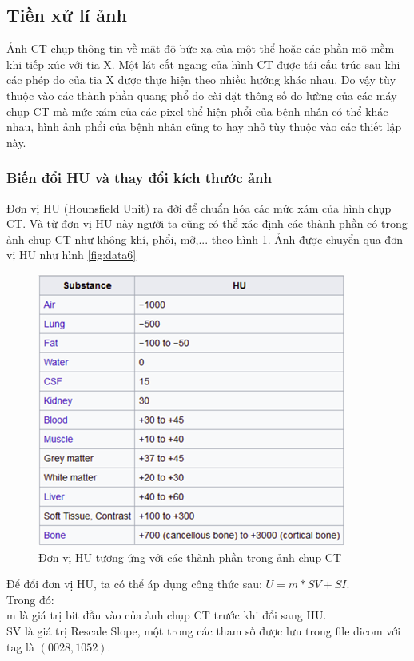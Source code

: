 \subsection{Tiền xử lí ảnh}
Ảnh CT chụp thông tin về mật độ bức xạ của một thể hoặc các phần mô mềm khi tiếp xúc với tia X. Một lát cắt ngang của hình CT được tái cấu trúc sau khi các phép đo của tia X được thực hiện theo nhiều hướng khác nhau. Do vậy tùy thuộc vào các thành phần quang phổ do cài đặt thông số đo lường của các máy chụp CT mà mức xám của các pixel thể hiện phổi của bệnh nhân có thể khác nhau, hình ảnh phổi của bệnh nhân cũng to hay nhỏ tùy thuộc vào các thiết lập này.\par
\subsubsection{Biến đổi HU và thay đổi kích thước ảnh}
Đơn vị HU (Hounsfield Unit) ra đời để chuẩn hóa các mức xám của hình chụp CT. Và từ đơn vị HU này người ta cũng có thể xác định các thành phần có trong ảnh chụp CT như không khí, phổi, mỡ,... theo hình \ref{fig:data5}. Ảnh được chuyển qua đơn vị HU như hình \ref{fig:data6}\\
\begin{figure}[ht!]
\centerline{\includegraphics[scale=0.8]{images/data5.png}}
\caption{Đơn vị HU tương ứng với các thành phần trong ảnh chụp CT}
\label{fig:data5}
\end{figure}
Để đổi đơn vị HU, ta có thể áp dụng công thức sau: $U=m*SV + SI$.\\ 
Trong đó:\\
\tab m là giá trị bit đầu vào của ảnh chụp CT trước khi đổi sang HU.\\
\tab SV là giá trị Rescale Slope, một trong các tham số được lưu trong file dicom với tag là $(0028,1052)$.\\

